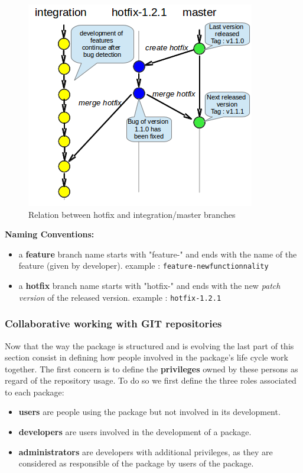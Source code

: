 \documentclass[12pt,a4paper]{article}
\begin{document}
\begin{figure}
\center
\includegraphics[scale=1]{images/hotfix_branching.png}
\caption{Relation between hotfix and integration/master branches}
\label{fig:hotfix-branches}
\end{figure}

\textbf{Naming Conventions:}
\begin{itemize}
\item a \textbf{feature} branch name starts with "feature-" and ends with the name of the feature (given by developer).
\linebreak example : \texttt{feature-newfunctionnality}
\item a \textbf{hotfix} branch name starts with "hotfix-" and ends with the new \textit{patch version} of the released version.
\linebreak example : \texttt{hotfix-1.2.1}
\end{itemize}

\subsubsection{Collaborative working with GIT repositories}
\label{sec:gitrepositories}

Now that the way the package is structured and is evolving the last part of this section consist in defining how people involved in the package's life cycle work together. The first concern is to define the \textbf{privileges} owned by these persons as regard of the repository usage. To do so we first define the three roles associated to each package:
\begin{itemize}
\item \textbf{users} are people using the package but not involved in its development.
\item \textbf{developers} are users involved in the development of a package.
\item \textbf{administrators} are developers with additional privileges, as they are considered as responsible of the package by users of the package.
\end{itemize}
\end{document}
